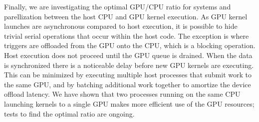 Finally, we are investigating the optimal GPU/CPU ratio for systems and
parellization between the host CPU and GPU kernel execution. As GPU kernel
launches are asynchronous compared to host execution, it is possible to hide
trivial serial operations that occur within the host code. The exception is
where triggers are offloaded from the GPU onto the CPU, which is a blocking
operation. Host execution does not proceed until the GPU queue is drained.
When the data is synchronized there is a noticeable delay before new GPU
kernels are executing. This can be minimized by executing multiple host
processes that submit work to the same GPU, and by batching additional work
together to amortize the device offload latency. We have shown that two
processes running on the same CPU launching kernels to a single GPU makes more
efficient use of the GPU resources; tests to find the optimal ratio are
ongoing.

